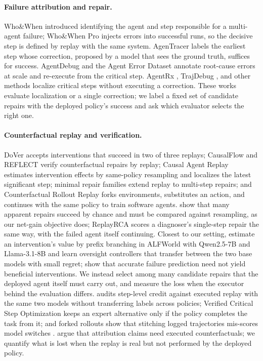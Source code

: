 \documentclass{article}
\theoremstyle{plain}
\theoremstyle{definition}
\theoremstyle{remark}
\begin{document}
\paragraph{Failure attribution and repair.}
Who\&When \citep{zhang2025whowhen} introduced identifying the agent and step responsible for a multi-agent failure; Who\&When Pro \citep{liu2026whowhenpro} injects errors into successful runs, so the decisive step is defined by replay with the same system. AgenTracer \citep{zhang2025agentracer} labels the earliest step whose correction, proposed by a model that sees the ground truth, suffices for success. AgentDebug \citep{zhu2025agentdebug} and the Agent Error Dataset \citep{zhu2026aed} annotate root-cause errors at scale and re-execute from the critical step. AgentRx \citep{barke2026agentrx}, TrajDebug \citep{qi2026trajdebug}, and other methods \citep{xia2026agentlocate,nguyen2026soap} localize critical steps without executing a correction. These works evaluate localization or a single correction; we label a fixed set of candidate repairs with the deployed policy's success and ask which evaluator selects the right one.

\paragraph{Counterfactual replay and verification.}
DoVer \citep{ma2025dover} accepts interventions that succeed in two of three replays; CausalFlow \citep{bonagiri2026causalflow} and REFLECT \citep{lin2026reflect} verify counterfactual repairs by replay; Causal Agent Replay \citep{shah2026car} estimates intervention effects by same-policy resampling and localizes the latest significant step; minimal repair families \citep{li2026mrfr} extend replay to multi-step repairs; and Counterfactual Rollout Replay \citep{li2026crr} forks environments, substitutes an action, and continues with the same policy to train software agents. \citet{luan2026repair} show that many apparent repairs succeed by chance and must be compared against resampling, as our net-gain objective does; ReplayRCA \citep{canale2026replayrca} scores a diagnoser's single-step repair the same way, with the failed agent itself continuing. Closest to our setting, \citet{zhang2026intervention} estimate an intervention's value by prefix branching in ALFWorld with Qwen2.5-7B and Llama-3.1-8B and learn oversight controllers that transfer between the two base models with small regret; \citet{vasudev2026prediction} show that accurate failure prediction need not yield beneficial interventions. We instead select among many candidate repairs that the deployed agent itself must carry out, and measure the loss when the executor behind the evaluation differs. \citet{zhang2026credit} audits step-level credit against executed replay with the same two models without transferring labels across policies; Verified Critical Step Optimization \citep{li2026cso} keeps an expert alternative only if the policy completes the task from it; and forked rollouts show that stitching logged trajectories mis-scores model switches \citep{gonuguntla2026replaygap}. \citet{pakhomov2026executed} argue that attribution claims need executed counterfactuals; we quantify what is lost when the replay is real but not performed by the deployed policy.
\end{document}
